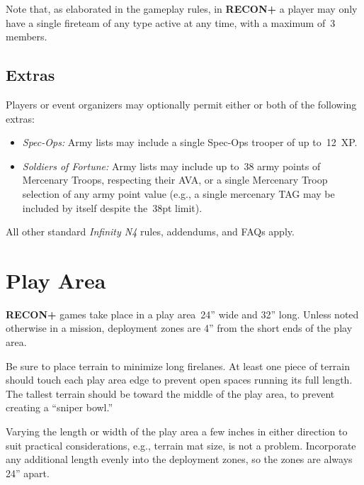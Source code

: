 \documentclass[14pt,dvipsnames]{extarticle}
\newcommand{\reconplus}{\textbf{RECON+}\xspace}
\begin{document}
\begin{recon}
Note that, as elaborated in the gameplay rules, in \reconplus a player
may only have a single fireteam of any type active at any time, with a
maximum of~3 members.
\end{recon}

\subsection{Extras}

Players or event organizers may optionally permit either or both of
the following extras:

\begin{itemize}
\item \emph{Spec-Ops:} Army lists may include a single Spec-Ops trooper of up to~12~XP.

\item \emph{Soldiers of Fortune:} Army lists may include up to~38 army
  points of Mercenary Troops, respecting their AVA, or a single
  Mercenary Troop selection of any army point value (e.g., a single
  mercenary TAG may be included by itself despite the~38pt limit).
\end{itemize}

All other standard \emph{Infinity N4} rules, addendums, and FAQs apply.


\clearpage
{}
\section{Play Area}

\reconplus games take place in a play area~24'' wide and 32'' long.
Unless noted otherwise in a mission, deployment zones are 4'' from the
short ends of the play area.

Be sure to place terrain to minimize long firelanes.  At least one
piece of terrain should touch each play area edge to prevent open
spaces running its full length.  The tallest terrain should be toward
the middle of the play area, to prevent creating a ``sniper bowl.''

\begin{recon}
  Varying the length or width of the play area a few inches in either
  direction to suit practical considerations, e.g., terrain mat size,
  is not a problem.  Incorporate any additional length evenly into the
  deployment zones, so the zones are always 24'' apart.
\end{recon}
\end{document}
